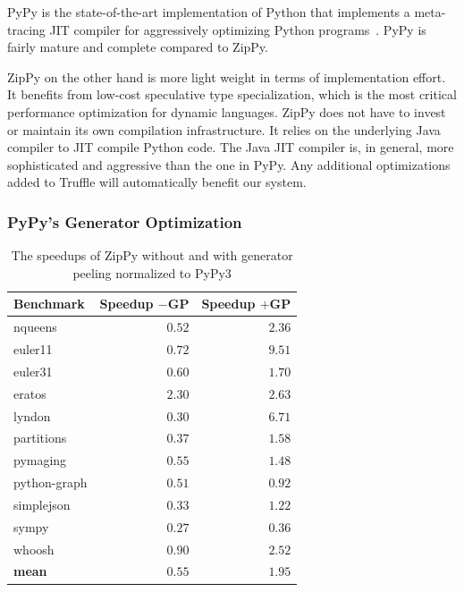 PyPy is the state-of-the-art implementation of Python that implements a meta-tracing JIT compiler for aggressively optimizing Python programs~\cite{bolz.etal09,Rigo2006}.
PyPy is fairly mature and complete compared to ZipPy.

ZipPy on the other hand is more light weight in terms of implementation effort.
It benefits from low-cost speculative type specialization, which is the most critical performance optimization for dynamic languages.
ZipPy does not have to invest or maintain its own compilation infrastructure.
It relies on the underlying Java compiler to JIT compile Python code.
The Java JIT compiler is, in general, more sophisticated and aggressive than the one in PyPy.
Any additional optimizations added to Truffle will automatically benefit our system.

\subsubsection*{PyPy's Generator Optimization}

\begin{table}
  \begin{center}
  \begin{tabular}{ l r r }
  \toprule
  Benchmark             & Speedup $-$GP & Speedup $+$GP \\
  \midrule
  \textsf{nqueens}      & $0.52$ & $2.36$ \\
  \textsf{euler11}      & $0.72$ & $9.51$ \\
  \textsf{euler31}      & $0.60$ & $1.70$ \\
  \textsf{eratos}       & $2.30$ & $2.63$ \\
  \textsf{lyndon}       & $0.30$ & $6.71$ \\
  \textsf{partitions}   & $0.37$ & $1.58$ \\
  \textsf{pymaging}     & $0.55$ & $1.48$ \\
  \textsf{python-graph} & $0.51$ & $0.92$ \\
  \textsf{simplejson}   & $0.33$ & $1.22$ \\
  \textsf{sympy}        & $0.27$ & $0.36$ \\
  \textsf{whoosh}       & $0.90$ & $2.52$ \\
  \textbf{mean}         & \textbf{$0.55$} & \textbf{$1.95$} \\
  \bottomrule
  \end{tabular}
  \caption{The speedups of ZipPy without and with generator peeling normalized to PyPy3}
  \label{tab:ch6-generator-benchmarks-zippy-vs-pypy}
  \end{center}
\end{table}

